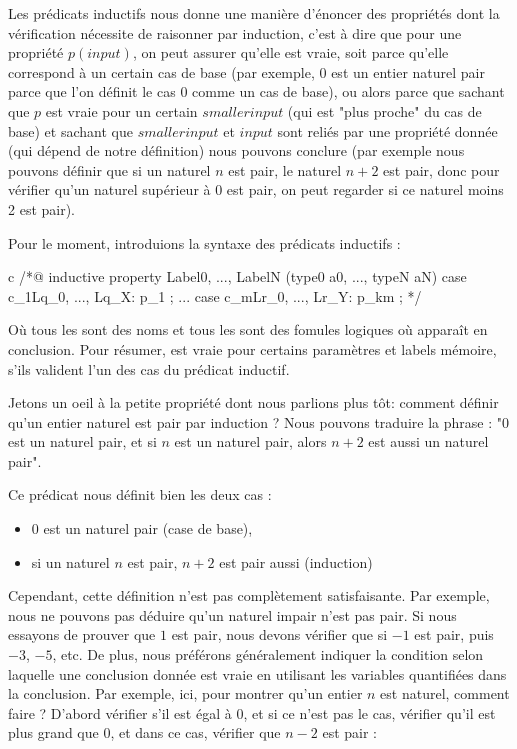 Les prédicats inductifs nous donne une manière d'énoncer des propriétés dont la
vérification nécessite de raisonner par induction, c'est à dire que pour une propriété
$p(input)$, on peut assurer qu'elle est vraie, soit parce qu'elle correspond à un
certain cas de base (par exemple, $0$ est un entier naturel pair parce que l'on
définit le cas 0 comme un cas de base), ou alors parce que sachant que $p$ est vraie
pour un certain $smaller input$ (qui est "plus proche" du cas de base) et sachant
que $smaller input$ et $input$ sont reliés par une propriété donnée (qui dépend
de notre définition) nous pouvons conclure (par exemple nous pouvons définir que
si un naturel $n$ est pair, le naturel $n+2$ est pair, donc pour vérifier qu'un
naturel supérieur à 0 est pair, on peut regarder si ce naturel moins 2 est pair).





Pour le moment, introduions la syntaxe des prédicats inductifs :

\begin{CodeBlock}{c}
/*@
  inductive property{ Label0, ..., LabelN }(type0 a0, ..., typeN aN) {
  case c_1{Lq_0, ..., Lq_X}: p_1 ;
  ...
  case c_m{Lr_0, ..., Lr_Y}: p_km ;
  }
*/
\end{CodeBlock}


Où tous les  sont des noms et tous les  sont
des fomules logiques où  apparaît en conclusion. Pour résumer,
 est vraie pour certains paramètres et labels mémoire, s'ils
valident l'un des cas du prédicat inductif.


Jetons un oeil à la petite propriété dont nous parlions plus tôt: comment définir
qu'un entier naturel est pair par induction ? Nous pouvons traduire la phrase :
"0 est un naturel pair, et si $n$ est un naturel pair, alors $n+2$ est aussi un
naturel pair".




Ce prédicat nous définit bien les deux cas :


\begin{itemize}
\item $0$ est un naturel pair (case de base),
\item si un naturel $n$ est pair, $n+2$ est pair aussi (induction)
\end{itemize}



Cependant, cette définition n'est pas complètement satisfaisante. Par exemple,
nous ne pouvons pas déduire qu'un naturel impair n'est pas pair. Si nous essayons
de prouver que $1$ est pair, nous devons vérifier que si $-1$ est pair, puis $-3$,
$-5$, etc. De plus, nous préférons généralement indiquer la condition selon
laquelle une conclusion donnée est vraie en utilisant les variables quantifiées
dans la conclusion. Par exemple, ici, pour montrer qu'un entier $n$ est naturel,
comment faire ? D'abord vérifier s'il est égal à 0, et si ce n'est pas le cas,
vérifier qu'il est plus grand que 0, et dans ce cas, vérifier que $n-2$ est pair :


